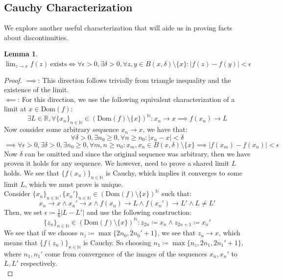 \documentclass[10pt,letterpaper]{article} %
\newtheorem{lem}{Lemma}[section]
\begin{document}
\subsection{Cauchy Characterization}
We explore another useful characterization that will aide us in proving facts about discontinuities. 
\begin{lem}
$\lim_{z \xrightarrow{} x}f(z) \ \text{exists} \iff \forall \epsilon > 0, \exists \delta > 0, \forall z, y \in B(x, \delta) \setminus \{x\}: |f(z) - f(y)| < \epsilon$
\end{lem}
\begin{proof}
$\implies$: This direction follows trivially from triangle inequality and the existence of the limit.\\

$\impliedby$: For this direction, we use the following equivalent characterization of a limit at $x \in \text{Dom}(f)$:
\begin{equation*}
\exists L \in \mathbb{R}, \forall \{x_n\}_{n \in \mathbb{N}} \in (\text{Dom}(f)\setminus \{x\})^\mathbb{N}: x_n \xrightarrow{} x \implies f(x_n) \xrightarrow{} L
\end{equation*}
Now consider some arbitrary sequence $x_n \xrightarrow{} x$, we have that:
\begin{equation*}
\forall \delta > 0, \exists n_0 \geqslant 0, \forall n \geqslant n_0: |x_n - x| < \delta
\end{equation*}
\begin{equation*}
\implies \forall \epsilon > 0, \exists \delta > 0, \exists n_0 \geqslant 0, \forall m, n \geqslant n_0: x_m, x_n \in B(x, \delta)\setminus\{x\} \implies |f(x_m) - f(x_n)| < \epsilon
\end{equation*}
Now $\delta$ can be omitted and since the original sequence was arbitrary, then we have proven it holds for any sequence. We however, need to prove a shared limit $L$ holds. We see that $\{f(x_n)\}_{n \in \mathbb{N}}$ is Cauchy, which implies it converges to some limit $L$, which we must prove is unique.\\

Consider $\{x_n\}_{n \in \mathbb{N}}, \{x_n'\}_{n \in \mathbb{N}} \in (\text{Dom}(f)\setminus \{x\})^\mathbb{N}$ such that:
\begin{equation*}
x_n \xrightarrow{} x \land x_n' \xrightarrow{} x \land f(x_n) \xrightarrow{} L \land f(x_n') \xrightarrow{} L' \land L \neq L'
\end{equation*}
Then, we set $\epsilon \coloneq \frac{1}{6}|L - L'|$ and use the following construction:
\begin{equation*}
\{z_n\}_{n \in \mathbb{N}} \in (\text{Dom}(f)\setminus \{x\})^\mathbb{N}: z_{2n} \coloneq x_n \land z_{2n+1} \coloneq x_n'
\end{equation*}
We see that if we choose $n_z \coloneq \max\{2n_0, 2n_0' + 1\}$, we see that $z_n \xrightarrow{} x$, which means that $\{f(z_n)\}_{n \in \mathbb{N}}$ is Cauchy. So choosing $n_1 \coloneq \max\{n_z, 2n_1, 2n_1' + 1\}$, where $n_1, n_1'$ come from convergence of the images of the sequences $x_n, x_n'$ to $L, L'$ respectively.\\


\end{proof}
\end{document}
